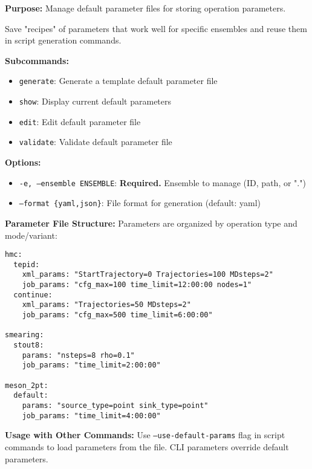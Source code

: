 \documentclass{article}
\begin{document}
\textbf{Purpose:} Manage default parameter files for storing operation parameters.

Save "recipes" of parameters that work well for specific ensembles and reuse them in script generation commands.

\textbf{Subcommands:}
\begin{itemize}
\item \texttt{generate}: Generate a template default parameter file
\item \texttt{show}: Display current default parameters  
\item \texttt{edit}: Edit default parameter file
\item \texttt{validate}: Validate default parameter file
\end{itemize}

\textbf{Options:}
\begin{itemize}
\item \texttt{-e, --ensemble ENSEMBLE}: \textbf{Required.} Ensemble to manage (ID, path, or ".")
\item \texttt{--format \{yaml,json\}}: File format for generation (default: yaml)
\end{itemize}

\textbf{Parameter File Structure:}
Parameters are organized by operation type and mode/variant:

\begin{lstlisting}
hmc:
  tepid:
    xml_params: "StartTrajectory=0 Trajectories=100 MDsteps=2"
    job_params: "cfg_max=100 time_limit=12:00:00 nodes=1"
  continue:
    xml_params: "Trajectories=50 MDsteps=2"
    job_params: "cfg_max=500 time_limit=6:00:00"
    
smearing:
  stout8:
    params: "nsteps=8 rho=0.1"
    job_params: "time_limit=2:00:00"

meson_2pt:
  default:
    params: "source_type=point sink_type=point"
    job_params: "time_limit=4:00:00"
\end{lstlisting}

\textbf{Usage with Other Commands:}
Use \texttt{--use-default-params} flag in script commands to load parameters from the file. CLI parameters override default parameters.
\end{document}
